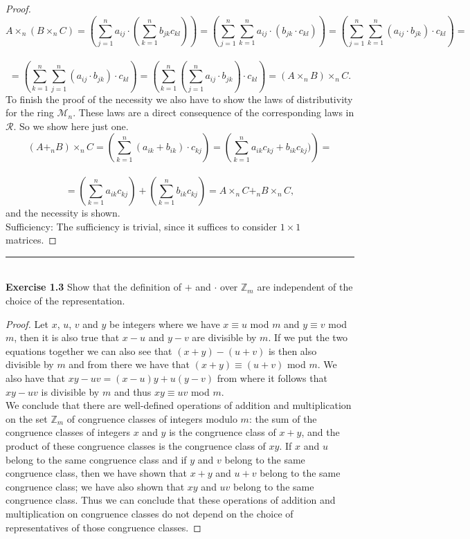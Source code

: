 \documentclass[a4paper]{article}
\begin{document}
\begin{proof}
$$A \times_{n} (B \times_{n} C) = \left(\sum_{j=1}^{n}{a_{ij}} \cdot \left( \sum_{k=1}^{n}{b_{jk}c_{kl}}\right)\right) = \left(\sum_{j=1}^{n}\sum_{k=1}^{n}{a_{ij} \cdot (b_{jk} \cdot c_{kl})} \right)= \left(\sum_{j=1}^{n}\sum_{k=1}^{n}{(a_{ij} \cdot b_{jk}) \cdot c_{kl}} \right)=$$\\ $$= \left(\sum_{k=1}^{n}\sum_{j=1}^{n}{(a_{ij} \cdot b_{jk}) \cdot c_{kl}}\right) = \left( \sum_{k=1}^{n}\left(\sum_{j=1}^{n}{a_{ij} \cdot b_{jk}} \right) \cdot c_{kl} \right) = (A \times_{n} B) \times_{n} C.$$
To finish the proof of the necessity we also have to show the laws of distributivity for the ring $\mathcal{M}_{n}$. These laws are a direct consequence of the corresponding laws in $\mathcal{R}$. So we show here just one.
$$(A +_{n} B) \times_{n} C = \left(\sum_{k=1}^{n}{(a_{ik}+b_{ik}) \cdot c_{kj}}\right) = \left(\sum_{k=1}^{n}{a_{ik}c_{kj}+b_{ik}c_{kj})}\right)=$$\\ $$= \left(\sum_{k=1}^{n}{a_{ik}c_{kj}}\right) + \left(\sum_{k=1}^{n}{b_{ik}c_{kj}}\right) = A \times_{n} C +_{n} B \times_{n} C,$$
and the necessity is shown.\\
Sufficiency: The sufficiency is trivial, since it suffices to consider $1 \times 1$ matrices.
\end{proof}



\noindent\rule{12cm}{0.4pt}\\
\noindent \textbf{Exercise 1.3} Show that the definition of $+$ and $\cdot$ over $\mathbb{Z}_m$ are independent of the choice of the representation.
\begin{proof}
Let $x$, $u$, $v$ and $y$ be integers where we have $x \equiv u$ mod $m$ and $y \equiv v$ mod $m$, then it is also true that $x -u$ and $y - v$ are divisible by $m$. If we put the two equations together we can also see that $(x + y) - (u + v)$ is then also divisible by $m$ and from there we have that $(x+y) \equiv (u+v)$ mod $m$. We also have that $xy - uv = (x-u)y + u(y-v)$ from where it follows that $xy-uv$ is divisible by $m$ and thus $xy \equiv uv$ mod $m$.\\
We conclude that there are well-defined operations of addition and multiplication on the set $\mathbb{Z}_{m}$ of congruence classes of integers modulo $m$: the sum of the congruence classes of integers $x$ and $y$ is the congruence class of $x+y$, and the product of these congruence classes is the congruence class of $xy$. If $x$ and $u$ belong to the same congruence class and if $y$ and $v$ belong to the same congruence class, then we have shown that $x+y$ and $u+v$ belong to the same congruence class; we have also shown that $xy$ and $uv$ belong to the same congruence class. Thus we can conclude that these operations of addition and multiplication on congruence classes do not depend on the choice of representatives of those congruence classes.
\end{proof}
\end{document}
